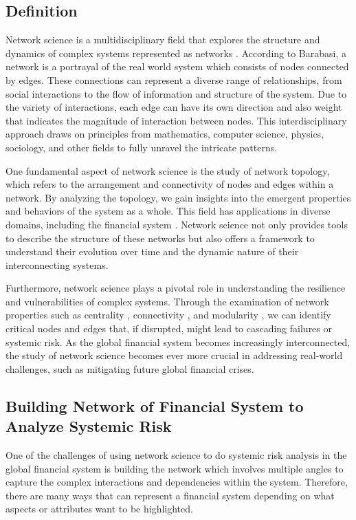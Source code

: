 \documentclass[a4paper,11pt]{article}
\begin{document}
\subsection{Definition}
Network science is a multidisciplinary field that explores the structure and dynamics of complex systems represented as networks \citep{Barabasi_2013}. According to Barabasi, a network is a portrayal of the real world system which consists of nodes connected by edges. These connections can represent a diverse range of relationships, from social interactions to the flow of information and structure of the system. Due to the variety of interactions, each edge can have its own direction and also weight that indicates the magnitude of interaction between nodes. This interdisciplinary approach draws on principles from mathematics, computer science, physics, sociology, and other fields to fully unravel the intricate patterns.

One fundamental aspect of network science is the study of network topology, which refers to the arrangement and connectivity of nodes and edges within a network. By analyzing the topology, we gain insights into the emergent properties and behaviors of the system as a whole. This field has applications in diverse domains, including the financial system \citep{Patro_Qi_Sun_2013}. Network science not only provides tools to describe the structure of these networks but also offers a framework to understand their evolution over time and the dynamic nature of their interconnecting systems.

Furthermore, network science plays a pivotal role in understanding the resilience and vulnerabilities of complex systems. Through the examination of network properties such as centrality \citep{Roukny_Battiston_Stiglitz_2016}, connectivity \citep{So_Chan_Chu_2021}, and modularity \citep{Rovira_Kaltwasser_Spelta_2018}, we can identify critical nodes and edges that, if disrupted, might lead to cascading failures or systemic risk. As the global financial system becomes increasingly interconnected, the study of network science becomes ever more crucial in addressing real-world challenges, such as mitigating future global financial crises.

\subsection{Building Network of Financial System to Analyze Systemic Risk}
One of the challenges of using network science to do systemic risk analysis in the global financial system is building the network which involves multiple angles to capture the complex interactions and dependencies within the system. Therefore, there are many ways that can represent a financial system depending on what aspects or attributes want to be highlighted.
\end{document}

